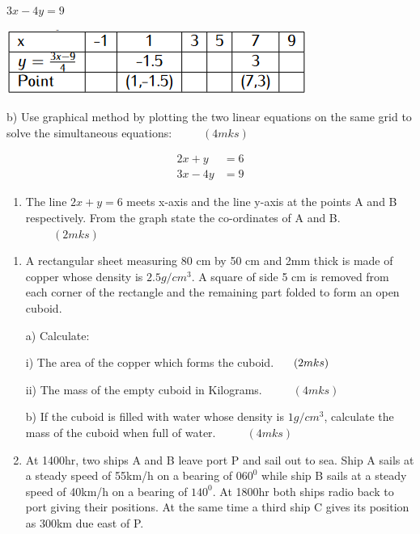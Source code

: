 \documentclass[
  a4paperpaper,
]{scrbook}
\providecommand{\tightlist}{%
  \setlength{\itemsep}{0pt}\setlength{\parskip}{0pt}}\usepackage{longtable,booktabs,array}
\begin{document}
\begin{tcolorbox}
\begin{enumerate}
  \(3x-4y=9\)

  \includegraphics{figures/Md5_Q17b.png}

  b) Use graphical method by plotting the two linear equations on the
  same grid to solve the simultaneous equations: \(\hspace{1cm} (4mks)\)
\end{enumerate}

\[
\begin{split}
2x+y&=6\\
3x-4y&=9
\end{split}
\]

\begin{enumerate}
\def\labelenumi{\alph{enumi})}
\setcounter{enumi}{2}
\tightlist
\item
  The line \(2x+y=6\) meets x-axis and the line y-axis at the points A
  and B respectively. From the graph state the co-ordinates of A and B.
  \(\hspace{1cm}(2mks)\)
\end{enumerate}

\begin{enumerate}
\def\labelenumi{\arabic{enumi}.}
\setcounter{enumi}{17}
\item
  A rectangular sheet measuring 80 cm by 50 cm and 2mm thick is made of
  copper whose density is \(2.5 g/cm^3\). A square of side 5 cm is
  removed from each corner of the rectangle and the remaining part
  folded to form an open cuboid.

  a) Calculate:

  i) The area of the copper which forms the
  cuboid.\(\hspace{0.6cm} (2mks)\)

  ii) The mass of the empty cuboid in Kilograms. \(\hspace{1cm} (4mks)\)

  b) If the cuboid is filled with water whose density is \(1 g/cm^3\),
  calculate the mass of the cuboid when full of water.
  \(\hspace{1cm} (4mks)\)
\item
  At 1400hr, two ships A and B leave port P and sail out to sea. Ship A
  sails at a steady speed of 55km/h on a bearing of \(060^0\) while ship
  B sails at a steady speed of 40km/h on a bearing of \(140^0\). At
  1800hr both ships radio back to port giving their positions. At the
  same time a third ship C gives its position as 300km due east of P.


\end{enumerate}
\end{tcolorbox}
\end{document}
